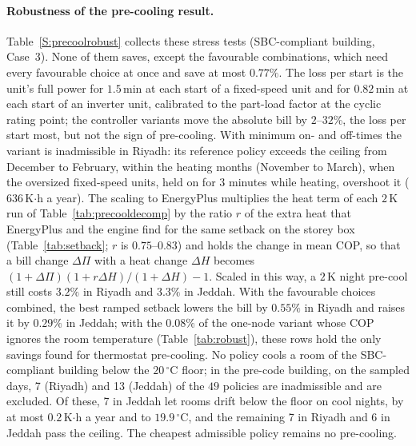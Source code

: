 \documentclass[10pt,a4paper,twocolumn]{article}
\theoremstyle{definition}
\begin{document}
\paragraph{Robustness of the pre-cooling result.} Table~\ref{S:precoolrobust} collects these stress tests (SBC-compliant building, Case~3). None of them saves, except the favourable combinations, which need every favourable choice at once and save at most $0.77\%$. The loss per start is the unit's full power for $1.5\,$min at each start of a fixed-speed unit and for $0.82\,$min at each start of an inverter unit, calibrated to the part-load factor at the cyclic rating point; the controller variants move the absolute bill by $2$--$32$\%, the loss per start most, but not the sign of pre-cooling. With minimum on- and off-times the variant is inadmissible in Riyadh: its reference policy exceeds the ceiling from December to February, within the heating months (November to March), when the oversized fixed-speed units, held on for $3$ minutes while heating, overshoot it ($636$\,K$\cdot$h a year). The scaling to EnergyPlus multiplies the heat term of each $2\,$K run of Table~\ref{tab:precooldecomp} by the ratio $r$ of the extra heat that EnergyPlus and the engine find for the same setback on the storey box (Table~\ref{tab:setback}; $r$ is $0.75$--$0.83$) and holds the change in mean COP, so that a bill change $\Delta\Pi$ with a heat change $\Delta H$ becomes $(1+\Delta\Pi)(1+r\Delta H)/(1+\Delta H)-1$. Scaled in this way, a $2\,$K night pre-cool still costs $3.2\%$ in Riyadh and $3.3\%$ in Jeddah. With the favourable choices combined, the best ramped setback lowers the bill by $0.55\%$ in Riyadh and raises it by $0.29\%$ in Jeddah; with the $0.08\%$ of the one-node variant whose COP ignores the room temperature (Table~\ref{tab:robust}), these rows hold the only savings found for thermostat pre-cooling. No policy cools a room of the SBC-compliant building below the $20\,^{\circ}$C floor; in the pre-code building, on the sampled days, 7 (Riyadh) and 13 (Jeddah) of the $49$ policies are inadmissible and are excluded. Of these, 7 in Jeddah let rooms drift below the floor on cool nights, by at most $0.2\,$K$\cdot$h a year and to $19.9\,^{\circ}$C, and the remaining 7 in Riyadh and 6 in Jeddah pass the ceiling. The cheapest admissible policy remains no pre-cooling.
\end{document}
